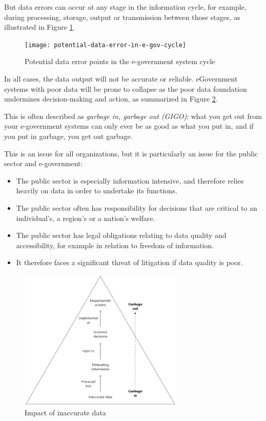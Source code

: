 But data errors can occur at any stage in the information cycle, for example, during processing, storage, output or transmission between those stages, as illustrated in Figure \ref{fig:poterntial-data-error-in-e-gov-cycle}.


\begin{figure}[th!]
	\centering
	\texttt{[image: potential-data-error-in-e-gov-cycle]}
	\caption{Potential data error points in the e-government system cycle}
	\label{fig:poterntial-data-error-in-e-gov-cycle}
\end{figure}

In all cases, the data output will not be accurate or reliable. eGovernment systems with poor data will be prone to collapse as the poor data foundation undermines decision-making and action, as summarized in Figure \ref{fig:impact-of-inaccurate-data}.


This is often described as \textit{garbage in, garbage out (GIGO)}: what you get out from your e-government systems can only ever be as good as what you put in, and
if you put in garbage, you get out garbage. 

This is an issue for all organizations, but it is particularly an issue for the public sector and e-government:
\begin{itemize}
	\item The public sector is especially information intensive, and therefore relies heavily on data in order to undertake its	functions.
	\item The public sector often has responsibility for decisions that are critical to an individual's, a region’s or a nation’s welfare. 
	\item The public sector has legal obligations relating to data quality and accessibility, for example in relation to freedom of	information. 
	\item It therefore faces a significant threat of litigation if data quality is poor.
\end{itemize}

\begin{figure}[ht!]
	\centering
	\includegraphics[width=0.7\textwidth]{graphics/impact-of-inaccurate-data}
	\caption{Impact of inaccurate data}
	\label{fig:impact-of-inaccurate-data}
\end{figure}

